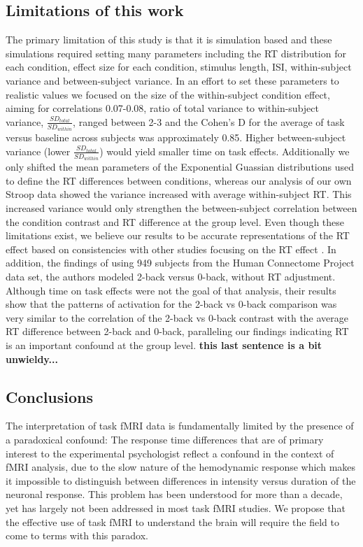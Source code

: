 \documentclass[titlepage,12pt] {article}
\begin{document}
\subsection*{Limitations of this work}
The primary limitation of this study is that it is simulation based and these simulations required setting many parameters including the RT distribution for each condition, effect size for each condition, stimulus length, ISI,  within-subject variance and between-subject variance.  In an effort to set these parameters to realistic values we focused on the size of the within-subject condition effect, aiming for correlations 0.07-0.08, ratio of total variance to within-subject variance, $\frac{SD_{total}}{SD_{within}}$,  ranged between 2-3 and the Cohen's D for the average of task versus baseline across subjects was approximately 0.85.  Higher between-subject variance (lower $\frac{SD_{total}}{SD_{within}}$) would yield smaller time on task effects.  Additionally we only shifted the mean parameters of the Exponential Guassian distributions used to define the RT differences between conditions, whereas our analysis of our own Stroop data showed the variance increased with average within-subject RT.  This increased variance would only strengthen the between-subject correlation between the condition contrast and RT difference at the group level.   Even though these limitations exist, we believe our results to be accurate representations of the RT effect based on consistencies with other studies focusing on the RT effect \citep{yarkoni_bold_2009, brown_medial_2011, grinband_dorsal_2011}.  In addition, the findings of \citet{li_neural_2021} using 949 subjects from the Human Connectome Project data set, the authors modeled 2-back versus 0-back, without RT adjustment.  Although time on task effects were not the goal of that analysis, their results show that the patterns of activation for the 2-back vs 0-back comparison was very similar to the correlation of the 2-back vs 0-back contrast with the average RT difference between 2-back and 0-back, paralleling our findings indicating RT is an important confound at the group level.  \textbf{this last sentence is a bit unwieldy...}

\subsection*{Conclusions}

The interpretation of task fMRI data is fundamentally limited by the presence of a paradoxical confound: The response time differences that are of primary interest to the experimental psychologist reflect a confound in the context of fMRI analysis, due to the slow nature of the hemodynamic response which makes it impossible to distinguish between differences in intensity versus duration of the neuronal response.  This problem has been understood for more than a decade, yet has largely not been addressed in most task fMRI studies.  We propose that the effective use of task fMRI to understand the brain will require the field to come to terms with this paradox.
\end{document}
